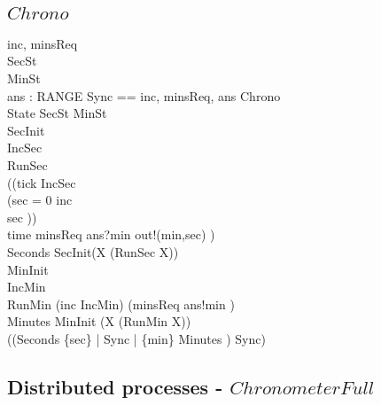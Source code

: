 \subsection{$Chrono$}
\begin{circus}
\circchannel inc, minsReq\\
\also SecSt \\
\also MinSt \\
\also \circchannel ans : RANGE
\also \circchannelset Sync == \lchanset inc, minsReq, ans \rchanset
\also \circprocess Chrono \circdef\ \circbegin\\
\circstate State  SecSt \land MinSt\\
 SecInit \\
 IncSec \\
 RunSec \circdef\\
((tick \then \lschexpract IncSec \rschexpract\circseq\\
    (\circif  sec = 0 \circthen inc \then \Skip\\
    \circelse sec  \circthen \Skip \circfi))\\
  \extchoice time \then minsReq \then ans?min \then out!(min,sec)
      \then \Skip )  \\
 Seconds \circdef \lschexpract SecInit\rschexpract \circseq (\circmu X \circspot (RunSec \circseq X))\\
 MinInit \\
 IncMin \\
 RunMin \circdef (inc \then \lschexpract IncMin\rschexpract ) \extchoice (minsReq \then ans!min \then \Skip)\\
 Minutes \circdef \lschexpract MinInit \rschexpract \circseq (\circmu X \circspot (RunMin \circseq X))\\
\circspot ((Seconds \lpar \{sec\} | Sync | \{min\} \rpar Minutes ) \circhide Sync)\\
\circend
\end{circus}
\subsection{Distributed processes - $ChronometerFull$}
